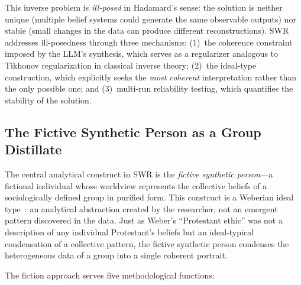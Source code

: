 \documentclass[11pt,a4paper]{article}
\begin{document}
This inverse problem is \emph{ill-posed} in Hadamard's sense: the solution is neither unique (multiple belief systems could generate the same observable outputs) nor stable (small changes in the data can produce different reconstructions). SWR addresses ill-posedness through three mechanisms: (1)~the coherence constraint imposed by the LLM's synthesis, which serves as a regularizer analogous to Tikhonov regularization in classical inverse theory; (2)~the ideal-type construction, which explicitly seeks the \emph{most coherent} interpretation rather than the only possible one; and (3)~multi-run reliability testing, which quantifies the stability of the solution.


\subsection{The Fictive Synthetic Person as a Group Distillate}
\label{sec:method:fiction}

The central analytical construct in SWR is the \emph{fictive synthetic person}---a fictional individual whose worldview represents the collective beliefs of a sociologically defined group in purified form. This construct is a Weberian ideal type~\citep{Weber1904}: an analytical abstraction created by the researcher, not an emergent pattern discovered in the data. Just as Weber's ``Protestant ethic'' was not a description of any individual Protestant's beliefs but an ideal-typical condensation of a collective pattern, the fictive synthetic person condenses the heterogeneous data of a group into a single coherent portrait.

The fiction approach serves five methodological functions:
\end{document}
